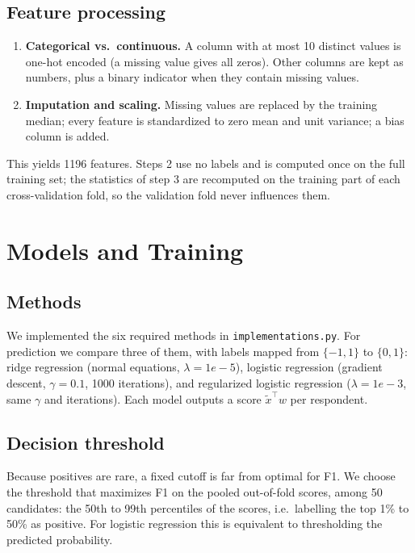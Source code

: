 \documentclass[10pt,conference]{IEEEtran}
\begin{document}
\subsection{Feature processing}
\begin{enumerate}
  \item \textbf{Categorical vs.\ continuous.} A column with at most 10
    distinct values is one-hot encoded (a missing value gives all zeros).
    Other columns are kept as numbers, plus a binary indicator when they
    contain missing values.
  \item \textbf{Imputation and scaling.} Missing values are replaced by the
    training median; every feature is standardized to zero mean and unit
    variance; a bias column is added.
\end{enumerate}
This yields 1196 features. Steps 2 use no labels and is computed once on
the full training set; the statistics of step 3 are recomputed on the
training part of each cross-validation fold, so the validation fold never
influences them.

\section{Models and Training}

\subsection{Methods}
We implemented the six required methods in \texttt{implementations.py}. For
prediction we compare three of them, with labels mapped from
$\{-1,1\}$ to $\{0,1\}$:
ridge regression (normal equations, $\lambda=1e-5$),
logistic regression (gradient descent, $\gamma=0.1$, 1000 iterations),
and regularized logistic regression ($\lambda=1e-3$, same $\gamma$ and
iterations). Each model outputs a score $\tilde{x}^\top w$ per respondent.

\subsection{Decision threshold}
Because positives are rare, a fixed cutoff is far from optimal for F1. We
choose the threshold that maximizes F1 on the pooled out-of-fold scores,
among 50 candidates: the 50th to 99th percentiles of the scores, i.e.\
labelling the top 1\% to 50\% as positive. For logistic regression this is
equivalent to thresholding the predicted probability.
\end{document}
